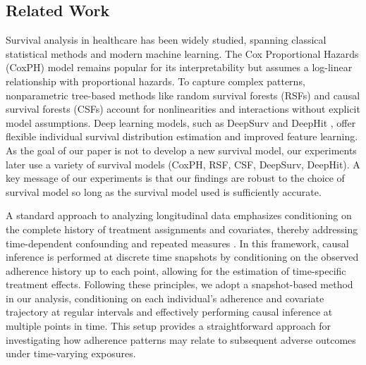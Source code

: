 \subsection{Related Work}
\label{ch03:sec:related_works}
Survival analysis in healthcare has been widely studied, spanning classical statistical methods and modern machine learning.
The Cox Proportional Hazards (CoxPH) model \citep{cox1972regression} remains popular for its interpretability but assumes a log-linear relationship with proportional hazards.
To capture complex patterns, nonparametric tree-based methods like random survival forests (RSFs) \citep{ishwaran2008random} and causal survival forests (CSFs) \citep{cui2023estimating} account for nonlinearities and interactions without explicit model assumptions.
Deep learning models, such as DeepSurv \citep{katzman2018deepsurv} and DeepHit \citep{lee2018deephit}, offer flexible individual survival distribution estimation and improved feature learning. 
As the goal of our paper is not to develop a new survival model, our experiments later use a variety of survival models (CoxPH, RSF, CSF, DeepSurv, DeepHit).
A key message of our experiments is that our findings are robust to the choice of survival model so long as the survival model used is sufficiently accurate.

A standard approach to analyzing longitudinal data emphasizes conditioning on the complete history of treatment assignments and covariates, thereby addressing time-dependent confounding and repeated measures \citep{fitzmaurice2009longitudinal, kennedy2019nonparametric}. 
In this framework, causal inference is performed at discrete time snapshots by conditioning on the observed adherence history up to each point, allowing for the estimation of time-specific treatment effects. 
Following these principles, we adopt a snapshot-based method in our analysis, conditioning on each individual's adherence and covariate trajectory at regular intervals and effectively performing causal inference at multiple points in time. 
This setup provides a straightforward approach for investigating how adherence patterns may relate to subsequent adverse outcomes under time-varying exposures.

